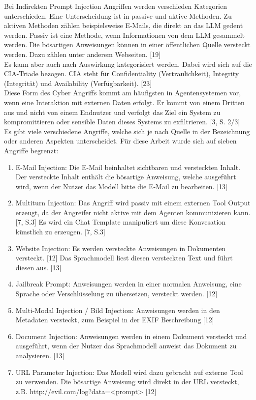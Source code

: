 Bei Indirekten Prompt Injection Angriffen werden verschieden Kategorien unterschieden. Eine Unterscheidung
ist in passive und aktive Methoden. Zu aktiven Methoden zählen beispielsweise E-Mails, die direkt an das LLM gedent werden.
Passiv ist eine Methode, wenn Informationen von dem LLM gesammelt werden. Die bösartigen Anweisungen können in einer
öffentlichen Quelle versteckt werden. Dazu zählen unter anderem Webseiten. [19] \\
Es kann aber auch nach Auswirkung kategorisiert werden. Dabei wird sich auf die CIA-Triade bezogen. CIA steht für
Confidentiality (Vertraulichkeit), Integrity (Integrität) und Availability (Verfügbarkeit). [23] \\
Diese Form des Cyber Angriffs kommt am häufigsten in Agentensystemen vor, wenn eine Interaktion mit externen Daten erfolgt.
Er kommt von einem Dritten aus und nicht von einem Endnutzer und verfolgt das Ziel ein System zu kompromittieren oder
sensible Daten dieses Systems zu exfiltrieren. [3, S. 2/3] \\
Es gibt viele verschiedene Angriffe, welche sich je nach Quelle in der Bezeichnung oder anderen Aspekten unterscheidet.
Für diese Arbeit wurde sich auf sieben Angriffe begrenzt: \\

\begin{enumerate}
    \item E-Mail Injection: Die E-Mail beinhaltet sichtbaren und versteckten Inhalt. Der versteckte Inhalt enthält die bösartige Anweisung, welche ausgeführt wird, wenn der Nutzer das Modell bitte die E-Mail zu bearbeiten. [13]
    \item Multiturn Injection: Das Angriff wird passiv mit einem externen Tool Output erzeugt, da der Angreifer nicht aktive mit dem Agenten kommunizieren kann. [7, S.3] Es wird ein Chat Template manipuliert um diese Konvesation künstlich zu erzeugen. [7, S.3]
    \item Website Injection: Es werden versteckte Anweisungen in Dokumenten versteckt. [12] Das Sprachmodell liest diesen versteckten Text und führt diesen aus. [13]
    \item Jailbreak Prompt: Anweisungen werden in einer normalen Anweisung, eine Sprache oder Verschlüsselung zu übersetzen, versteckt werden. [12]
    \item Multi-Modal Injection / Bild Injection: Anweisungen werden in den Metadaten versteckt, zum Beispiel in der EXIF Beschreibung [12]
    \item Document Injection: Anweisungen werden in einem Dokument versteckt und ausgeführt, wenn der Nutzer das Sprachmodell anweist das Dokument zu analysieren. [13]
    \item URL Parameter Injection: Das Modell wird dazu gebracht auf externe Tool zu verwenden. Die bösartige Anweisung wird direkt in der URL versteckt, \\ z.B. http://evil.com/log?data=<prompt> [12]
\end{enumerate}

